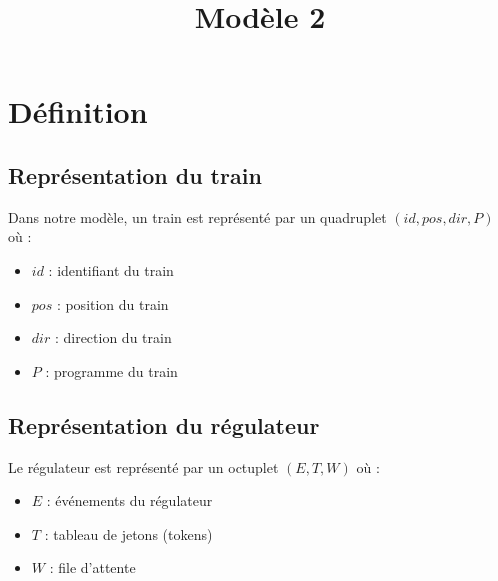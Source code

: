 \documentclass[12pt]{article}
\title{Modèle 2}
\author{}
\begin{document}
\newcommand\concat[2]{#1;#2}
\newcommand\train[4]{(#1, #2, #3, #4)} %
\newcommand\trainfull[4]{\Gamma \cup \train{#1}{#2}{#3}{#4}} 
\newcommand\reg[3]{(#1, #2, #3)} %

\newcommand\maj[2]{#1 \gets #2} %
\newcommand\majtab[3]{#1[#2] \gets #3}
\newcommand\supprdict[2]{#1' \gets suppr(#1, #2)} %
\newcommand\bracket[2]{
    \begin{math}
        \biggl\{
        \begin{array}{l}
            #1\\
            #2
        \end{array}
    \end{math}
}



\maketitle


\section{Définition}

\subsection{Représentation du train}
Dans notre modèle, un train est représenté par un quadruplet $(id, pos, dir, P)$ où :
\begin{itemize}
    \item $id$ : identifiant du train
    \item $pos$ : position du train 
    \item $dir$ : direction du train
    \item $P$ : programme du train
\end{itemize}

\subsection{Représentation du régulateur}
Le régulateur est représenté par un octuplet $(E, T, W)$ où :
\begin{itemize}
    \item $E$ : événements du régulateur
    \item $T$ : tableau de jetons (tokens)
    \item $W$ : file d'attente
\end{itemize}
\end{document}

